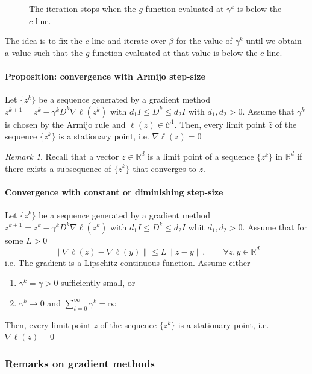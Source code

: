 \documentclass[openany]{book}
\newcommand{\R}{\mathbb{R}}                %
\theoremstyle{definition}
\theoremstyle{remark}
\newtheorem*{remark}{Remark}
\begin{document}
\begin{figure}[ht]
\begin{minipage}{.33\textwidth}
    \end{minipage}%
    \caption{The iteration stops when the $g$ function evaluated at $\gamma^k$ is below the $c$-line.}
\end{figure}

The idea is to fix the $c$-line and iterate over $\beta$ for the value of $\gamma^k$ until we obtain a value such that the $g$ function evaluated at that value is below the $c$-line.

\paragraph{Proposition: convergence with Armijo step-size}

Let $\{z^k\}$ be a sequence generated by a gradient method $z^{k+1}=z^k-\gamma^kD^k\nabla\ell(z^k)$ with $d_1I\leq D^k \leq d_2I$ with $d_1,d_2>0$. 
Assume that $\gamma^k$ is chosen by the Armijo rule and $\ell(z)\in \mathcal{C}^1$. Then, every limit point $\bar{z}$ of the sequence $\{z^k\}$ is a stationary point, i.e. $\nabla\ell(\bar{z})=0$
\begin{remark}
Recall that a vector $z\in\R^d$ is a limit point of a sequence $\{z^k\}$ in $\R^d$ if there exists a subsequence of $\{z^k\}$ that converges to $z$.
\end{remark}

\paragraph{Convergence with constant or diminishing step-size}

Let $\{z^k\}$ be a sequence generated by a gradient method $z^{k+1}=z^k-\gamma^kD^k\nabla\ell(z^k)$ with $d_1I\leq D^k \leq d_2I$ whit $d_1,d_2>0$. Assume that for some $L>0$ 
\[
    \|\nabla\ell(z)-\nabla\ell(y)\|\leq L\|z-y\|, \qquad \forall z,y\in\R^d
\]
i.e. The gradient is a Lipschitz continuous function.
Assume either
\begin{enumerate}
    \item $\gamma^k=\gamma>0$ sufficiently small, or 
    \item $\gamma^k\to 0$ and $\displaystyle\sum_{t=0}^{\infty}\gamma^k=\infty$
\end{enumerate}
Then, every limit point $\bar{z}$ of the sequence $\{z^k\}$ is a stationary point, i.e. $\nabla\ell(\bar{z})=0$

\subsubsection{Remarks on gradient methods}
\end{document}
